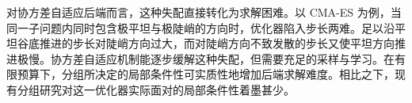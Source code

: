 对协方差自适应后端而言，这种失配直接转化为求解困难。以 CMA-ES 为例，当同一子问题内同时包含极平坦与极陡峭的方向时，优化器陷入步长两难。足以沿平坦谷底推进的步长对陡峭方向过大，而对陡峭方向不致发散的步长又使平坦方向推进极慢。协方差自适应机制能逐步缓解这种失配，但需要充足的采样与学习。在有限预算下，分组所决定的局部条件性可实质性地增加后端求解难度。相比之下，现有分组研究对这一优化器实际面对的局部条件性着墨甚少。